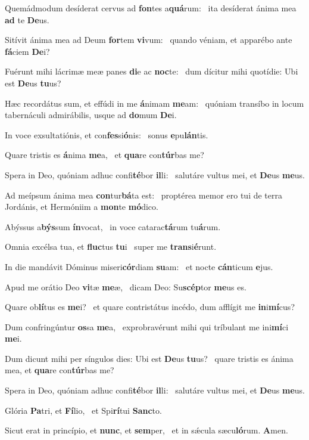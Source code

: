 \item Quemádmodum desíderat cervus ad \textbf{fon}tes a\textbf{quá}rum:~\psstar{} ita desíderat ánima mea \textbf{ad} te \textbf{De}us.
\item Sitívit ánima mea ad Deum \textbf{for}tem \textbf{vi}vum:~\psstar{} quando véniam, et apparébo ante \textbf{fá}ciem \textbf{De}i?
\item Fuérunt mihi lácrimæ meæ panes \textbf{di}e ac \textbf{noc}te:~\psstar{} dum dícitur mihi quotídie: Ubi est \textbf{De}us \textbf{tu}us?
\item Hæc recordátus sum, et effúdi in me \textbf{á}nimam \textbf{me}am:~\psstar{} quóniam transíbo in locum tabernáculi admirábilis, usque ad \textbf{do}mum \textbf{De}i.
\item In voce exsultatiónis, et con\textbf{fes}si\textbf{ó}nis:~\psstar{} sonus \textbf{e}pu\textbf{lán}tis.
\item Quare tristis es \textbf{á}nima \textbf{me}a,~\psstar{} et \textbf{qua}re con\textbf{túr}bas me?
\item Spera in Deo, quóniam adhuc confi\textbf{té}bor \textbf{il}li:~\psstar{} salutáre vultus mei, et \textbf{De}us \textbf{me}us.
\item Ad meípsum ánima mea \textbf{con}tur\textbf{bá}ta est:~\psstar{} proptérea memor ero tui de terra Jordánis, et Hermóniim a \textbf{mon}te \textbf{mó}dico.
\item Abýssus a\textbf{býs}sum \textbf{ín}vocat,~\psstar{} in voce catarac\textbf{tá}rum tu\textbf{á}rum.
\item Omnia excélsa tua, et \textbf{fluc}tus \textbf{tu}i~\psstar{} super me \textbf{trans}i\textbf{é}runt.
\item In die mandávit Dóminus miseri\textbf{cór}diam \textbf{su}am:~\psstar{} et nocte \textbf{cán}ticum \textbf{e}jus.
\item Apud me orátio Deo \textbf{vi}tæ \textbf{me}æ,~\psstar{} dicam Deo: Su\textbf{scép}tor \textbf{me}us es.
\item Quare ob\textbf{lí}tus es \textbf{me}i?~\psstar{} et quare contristátus incédo, dum afflígit me \textbf{in}i\textbf{mí}cus?
\item Dum confringúntur \textbf{os}sa \textbf{me}a,~\psstar{} exprobravérunt mihi qui tríbulant me ini\textbf{mí}ci \textbf{me}i.
\item Dum dicunt mihi per síngulos dies: Ubi est \textbf{De}us \textbf{tu}us?~\psstar{} quare tristis es ánima mea, et \textbf{qua}re con\textbf{túr}bas me?
\item Spera in Deo, quóniam adhuc confi\textbf{té}bor \textbf{il}li:~\psstar{} salutáre vultus mei, et \textbf{De}us \textbf{me}us.
\item Glória \textbf{Pa}tri, et \textbf{Fí}lio,~\psstar{} et Spi\textbf{rí}tui \textbf{Sanc}to.
\item Sicut erat in princípio, et \textbf{nunc}, et \textbf{sem}per,~\psstar{} et in sǽcula sæcu\textbf{ló}rum. \textbf{A}men.
